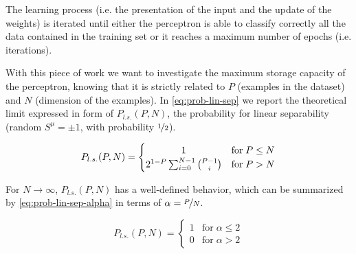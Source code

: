 The learning process (i.e. the presentation of the input and the update of the weights) is iterated until either the perceptron is able to classify correctly all the data contained in the training set or it reaches a maximum number of epochs (i.e. iterations).

With this piece of work we want to investigate the maximum storage capacity of the perceptron, knowing that it is strictly related to $P$ (examples in the dataset) and $N$ (dimension of the examples).
In \cref{eq:prob-lin-sep} we report the theoretical limit expressed in form of $P_{l.s.}(P,N)$, the probability for linear separability (random $S^\mu = \pm 1$, with probability $\nicefrac{1}{2}$).

\begin{equation} \label{eq:prob-lin-sep}
    P_{l.s.}(P,N) = \begin{cases}
        \hfil 1 & \text{for} \; P \leq N\\
        2^{1-P} \sum^{N-1}_{i=0} \binom{P - 1}{i} & \text{for} \; P > N       
    \end{cases}
\end{equation}

For $N \rightarrow \infty$, $P_{l.s.}(P,N)$ has a well-defined behavior, which can be summarized by \cref{eq:prob-lin-sep-alpha} in terms of $\alpha = \nicefrac{P}{N}$.

\begin{equation} \label{eq:prob-lin-sep-alpha}
    P_{l.s.}(P,N) = \begin{cases}
        1 & \text{for} \; \alpha \leq 2\\
        0 & \text{for} \; \alpha > 2
    \end{cases}
\end{equation} 